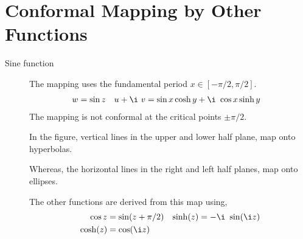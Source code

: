 \section{Conformal Mapping by Other Functions}

\begin{description}
    \item[Sine function] The mapping uses the fundamental period
        $ x \in [-\pi/2, \pi/2] $.
        \begin{align}
            w         & = \sin z                              &
            u + \i\ v & = \sin x \cosh y + \i\ \cos x \sinh y
        \end{align}
        The mapping is not conformal at the critical points $ \pm \pi/2 $. \par
        In the figure, vertical lines in the
        \textcolor{y_h}{upper} and \textcolor{y_p}{lower} half plane, map onto
        hyperbolas. \par
        Whereas, the horizontal lines in the \textcolor{y_t}{right} and
        \textcolor{azure4}{left} half planes, map onto ellipses.
        \begin{figure}[H]
            \centering
        \end{figure}
        The other functions are derived from this map using,
        \begin{align}
            \cos z   & = \sin(z + \pi/2) & \sinh(z) & = -\i\ \sin(\i z) \\
            \cosh(z) & = \cos(\i z)
        \end{align}


\end{description}
